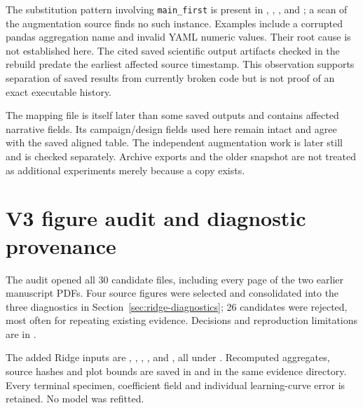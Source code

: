 The substitution pattern involving \texttt{main\_first} is present in , , , and ; a scan of the augmentation source finds no such instance. Examples include a corrupted pandas aggregation name and invalid YAML numeric values. Their root cause is not established here. The cited saved scientific output artifacts checked in the rebuild predate the earliest affected source timestamp. This observation supports separation of saved results from currently broken code but is not proof of an exact executable history.

The mapping file is itself later than some saved outputs and contains affected narrative fields. Its campaign/design fields used here remain intact and agree with the saved aligned table. The independent augmentation work is later still and is checked separately. Archive exports and the older snapshot are not treated as additional experiments merely because a copy exists.

\section{V3 figure audit and diagnostic provenance}
The audit opened all 30 candidate files, including every page of the two earlier manuscript PDFs. Four source figures were selected and consolidated into the three diagnostics in Section~\ref{sec:ridge-diagnostics}; 26 candidates were rejected, most often for repeating existing evidence. Decisions and reproduction limitations are in .

The added Ridge inputs are , , , ,  and , all under . Recomputed aggregates, source hashes and plot bounds are saved in  and  in the same evidence directory. Every terminal specimen, coefficient field and individual learning-curve error is retained. No model was refitted.

